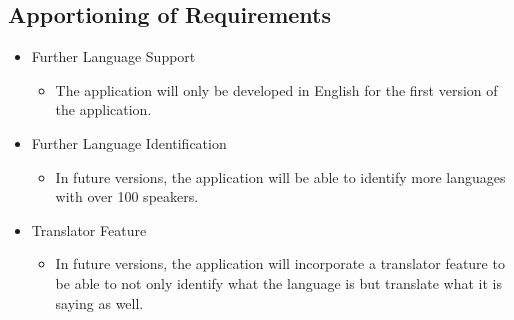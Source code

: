 \subsection{Apportioning of Requirements}
\label{sub:apportioning_of_requirements}
\begin{itemize}
	\item Further Language Support
	\begin{itemize}
		\item The application will only be developed in English for the first version of the application.
	\end{itemize}
	\item Further Language Identification
	\begin{itemize}
		\item In future versions, the application will be able to identify more languages with over 100 speakers.
	\end{itemize}
	\item Translator Feature
	\begin{itemize}
		\item In future versions, the application will incorporate a translator feature to be able to not only identify what the language is but translate what it is saying as well.
	\end{itemize}
\end{itemize}

